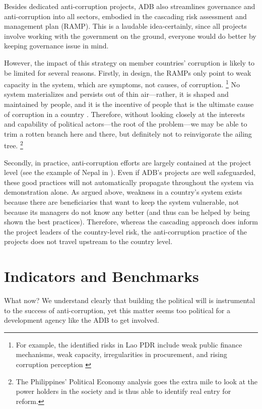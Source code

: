 \documentclass[12pt]{article}
\begin{document}
Besides dedicated anti-corruption projects, ADB also streamlines governance and anti-corruption into all sectors, embodied in the cascading risk assessment and management plan (RAMP). This is a laudable idea-certainly, since all projects involve working with the government on the ground, everyone would do better by keeping governance issue in mind.

However, the impact of this strategy on member countries' corruption is likely to be limited for several reasons. Firstly, in design, the RAMPs only point to weak capacity in the system, which are symptoms, not causes, of corruption. \footnote{For example, the identified risks in Lao PDR include weak public finance mechanisms, weak capacity, irregularities in procurement, and rising corruption perception \citep{ADB2011a}} No system materializes and persists out of thin air---rather, it is shaped and maintained by people, and it is the incentive of people that is the ultimate cause of corruption in a country \citep[6]{ADB2013}. Therefore, without looking closely at the interests and capability of political actors---the root of the problem---we may be able to trim a rotten branch here and there, but definitely not to reinvigorate the ailing tree. \footnote{The Philippines' Political Economy analysis goes the extra mile to look at the power holders in the society and is thus able to identify real entry for reform.}

Secondly, in practice, anti-corruption efforts are largely contained at the project level (see the example of Nepal in \citealp[15]{ADB2013}). Even if ADB's projects are well safeguarded, these good practices will not automatically propagate throughout the system via demonstration alone. As argued above, weakness in a country's system exists because there are beneficiaries that want to keep the system vulnerable, not because its managers do not know any better (and thus can be helped by being shown the best practices). Therefore, whereas the cascading approach does inform the project leaders of the country-level risk, the anti-corruption practice of the projects does not travel upstream to the country level.

\section{Indicators and Benchmarks}
\label{sec:IB}

What now? We understand clearly that building the political will is instrumental to the success of anti-corruption, yet this matter seems too political for a development agency like the ADB to get involved.
\end{document}
